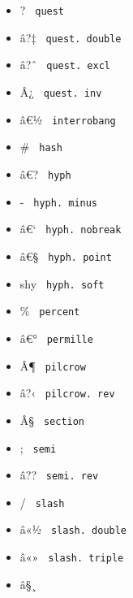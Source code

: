 \begin{itemize}
\item
  \label{symbol-quest}{{ ? } \texttt{\ quest\ }}
\item
  \label{symbol-quest.double}{{ â?‡ }
  \texttt{\ quest.\ double\ }}
\item
  \label{symbol-quest.excl}{{ â?ˆ }
  \texttt{\ quest.\ excl\ }}
\item
  \label{symbol-quest.inv}{{ Â¿ }
  \texttt{\ quest.\ inv\ }}
\item
  \label{symbol-interrobang}{{ â€½ }
  \texttt{\ interrobang\ }}
\item
  \label{symbol-hash}{{ \# } \texttt{\ hash\ }}
\item
  \label{symbol-hyph}{{ â€? } \texttt{\ hyph\ }}
\item
  \label{symbol-hyph.minus}{{ - }
  \texttt{\ hyph.\ minus\ }}
\item
  \label{symbol-hyph.nobreak}{{ â€` }
  \texttt{\ hyph.\ nobreak\ }}
\item
  \label{symbol-hyph.point}{{ â€§ }
  \texttt{\ hyph.\ point\ }}
\item
  \label{symbol-hyph.soft}{{ shy }
  \texttt{\ hyph.\ soft\ }}
\item
  \label{symbol-percent}{{ \% } \texttt{\ percent\ }}
\item
  \label{symbol-permille}{{ â€° } \texttt{\ permille\ }}
\item
  \label{symbol-pilcrow}{{ Â¶ } \texttt{\ pilcrow\ }}
\item
  \label{symbol-pilcrow.rev}{{ â?‹ }
  \texttt{\ pilcrow.\ rev\ }}
\item
  \label{symbol-section}{{ Â§ } \texttt{\ section\ }}
\item
  \label{symbol-semi}{{ ; } \texttt{\ semi\ }}
\item
  \label{symbol-semi.rev}{{ â?? }
  \texttt{\ semi.\ rev\ }}
\item
  \label{symbol-slash}{{ / } \texttt{\ slash\ }}
\item
  \label{symbol-slash.double}{{ â«½ }
  \texttt{\ slash.\ double\ }}
\item
  \label{symbol-slash.triple}{{ â«» }
  \texttt{\ slash.\ triple\ }}
\item
  \label{symbol-slash.big}{{ â§¸ }
}
\end{itemize}
